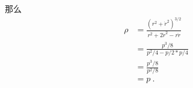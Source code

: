那么
\begin{equation}
\begin{aligned}
\rho &= \frac{(r^2 + \dot r^2)^{3/2}}{r^2 + 2\dot r^2 - r\ddot r}\\
&=\frac{p^3/8}{p^2/4 - p/2*p/4}\\
&=\frac{p^3/8}{p^2/8}\\
&=p~.\\
\end{aligned}
\end{equation}

